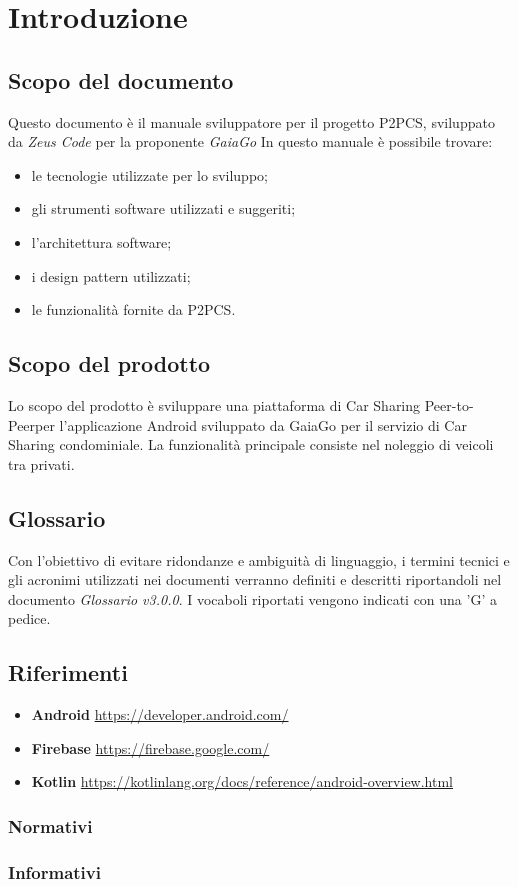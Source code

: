 \section{Introduzione} 
\subsection{Scopo del documento}
Questo documento è il manuale sviluppatore per il progetto P2PCS, sviluppato da \textit{Zeus Code} per la proponente \textit{GaiaGo}
In questo manuale è possibile trovare:
\begin{itemize}
	\item le tecnologie utilizzate per lo sviluppo;
	\item gli strumenti software utilizzati e suggeriti;
	\item l'architettura software;
	\item i design pattern utilizzati;
	\item le funzionalità fornite da P2PCS.
\end{itemize}
\subsection{Scopo del prodotto}
Lo scopo del prodotto è sviluppare una piattaforma di Car Sharing Peer-to-Peer\glosp per l'applicazione Android sviluppato da GaiaGo per il servizio di Car Sharing condominiale. La funzionalità principale consiste nel noleggio di veicoli tra privati.
\subsection{Glossario}
Con l’obiettivo di evitare ridondanze e ambiguità di linguaggio, i termini tecnici e gli acronimi utilizzati nei documenti verranno definiti e descritti riportandoli nel documento \textit{Glossario v3.0.0}.  I vocaboli riportati vengono indicati con una 'G' a pedice.
\subsection{Riferimenti}
\begin{itemize}
	\item \textbf{Android} \url{https://developer.android.com/}
	\item \textbf{Firebase} \url{https://firebase.google.com/}
	\item \textbf{Kotlin} \url{https://kotlinlang.org/docs/reference/android-overview.html}
\end{itemize}
\subsubsection{Normativi}

\subsubsection{Informativi}
